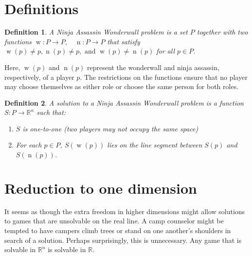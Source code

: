 \documentclass[12pt,x11names, rgb]{article}
\newtheorem*{definition}{Definition}
\DeclareMathOperator{\w}{w}
\DeclareMathOperator{\n}{n}
\begin{document}
\section{Definitions}

    \begin{definition}
    A \emph{Ninja Assassin Wonderwall problem} is a set $P$ together with two functions $\w:P\to P, \quad \n: P\to P$ that satisfy $\w(p) \neq p, \n(p) \neq p, \text{ and } \w(p) \neq \n(p)$ for all $p \in P$.
    \end{definition}

    Here, $\w(p)$ and $\n(p)$ represent the wonderwall and ninja assassin, respectively, of a player $p$. The restrictions on the functions ensure that no player may choose themselves as either role or choose the same person for both roles. 
	
	\vspace{12pt}
    \begin{definition}
    A \emph{solution} to a Ninja Assassin Wonderwall problem is a function $S: P\to \mathbb{R}^{n}$ such that:
        \begin{enumerate}
        \item $S$ is one-to-one (two players may not occupy the same space)
        \item For each $p \in P$, $S(\w(p))$ lies on the line segment between $S(p)$ and $S(\n(p))$.
        \end{enumerate}
    \end{definition}


\section{Reduction to one dimension}

    It seems as though the extra freedom in higher dimensions might allow solutions to games that are unsolvable on the real line. A camp counselor might be tempted to have campers climb trees or stand on one another's shoulders in search of a solution. Perhaps surprisingly, this is unnecessary. Any game that is solvable in $\mathbb{R}^n$ is solvable in $\mathbb{R}$.
\end{document}
